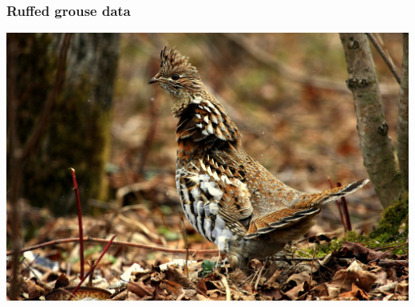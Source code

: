 \documentclass[color=usenames,dvipsnames]{beamer}\usepackage[]{graphicx}\usepackage[]{color}
\begin{document}






\begin{frame}
  \frametitle{Ruffed grouse data}
  \centering
  \includegraphics[width=\textwidth]{figs/RUGR}
\end{frame}
\end{document}
